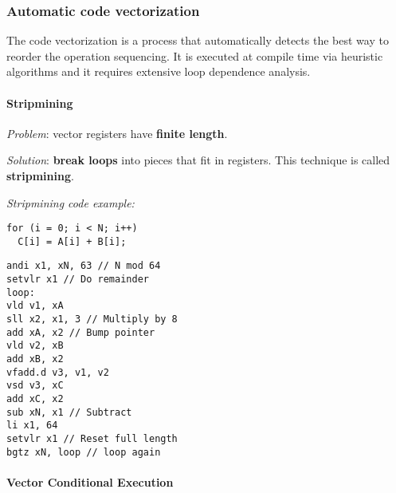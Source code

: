 \documentclass[english]{article}
\begin{document}
\subsubsection{Automatic code vectorization}

The code vectorization is a process that automatically detects the best way to reorder the operation sequencing.
It is executed at compile time via heuristic algorithms and it requires extensive loop dependence analysis.

\paragraph{Stripmining}

\textit{Problem}: vector registers have \textbf{finite length}.

\textit{Solution}: \textbf{break loops} into pieces that fit in registers.
This technique is called \textbf{stripmining}.

\begin{minipage}{\textwidth}
  \bigskip
  \textit{Stripmining code example:}
  \bigskip

  \begin{minipage}{\textwidth}
    \begin{minipage}[t]{0.33\textwidth}
      \begin{verbatim}
for (i = 0; i < N; i++)
  C[i] = A[i] + B[i];
  \end{verbatim}
    \end{minipage}
    \begin{minipage}[t]{0.33\textwidth}
      \begin{verbatim}
andi x1, xN, 63 // N mod 64
setvlr x1 // Do remainder
loop:
vld v1, xA
sll x2, x1, 3 // Multiply by 8
add xA, x2 // Bump pointer
vld v2, xB
add xB, x2
vfadd.d v3, v1, v2
vsd v3, xC
add xC, x2
sub xN, x1 // Subtract
li x1, 64
setvlr x1 // Reset full length
bgtz xN, loop // loop again
  \end{verbatim}
    \end{minipage}
    \begin{minipage}[t]{0.33\textwidth}
      \centering
    \end{minipage}
  \end{minipage}
\end{minipage}

\paragraph{Vector Conditional Execution}
\label{par:vector-conditional-execution}
\end{document}

